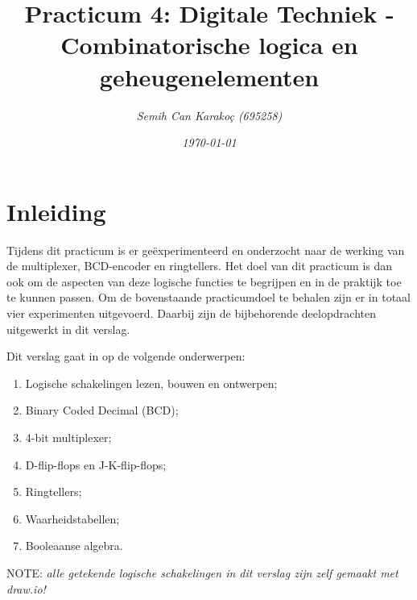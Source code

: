 \documentclass[12pt]{article}
\title{\textbf{Practicum 4: Digitale Techniek - Combinatorische logica en geheugenelementen }}
\author{\textit{Semih Can Karakoç (695258)}}
\date{\textit{\today}}
\begin{document}
\clearpage\maketitle    %
\thispagestyle{empty}  %
\begin{figure}[h]
    \centering
\end{figure}
\pagebreak

\tableofcontents    %
\pagebreak

\section{Inleiding}
Tijdens dit practicum is er geëxperimenteerd en onderzocht naar de werking van de multiplexer, BCD-encoder en ringtellers.
Het doel van dit practicum is dan ook om de aspecten van deze logische functies te begrijpen en in de praktijk toe te kunnen passen.
Om de bovenstaande practicumdoel te behalen zijn er in totaal vier experimenten uitgevoerd. 
Daarbij zijn de bijbehorende deelopdrachten uitgewerkt in dit verslag. 

Dit verslag gaat in op de volgende onderwerpen: 
\begin{enumerate}
    \item Logische schakelingen lezen, bouwen en ontwerpen;
    \item Binary Coded Decimal (BCD);
    \item 4-bit multiplexer;
    \item D-flip-flops en J-K-flip-flops;
    \item Ringtellers;
    \item Waarheidstabellen;
    \item Booleaanse algebra.
\end{enumerate}
\vspace{9cm}
NOTE: \textit{alle getekende logische schakelingen in dit verslag zijn zelf gemaakt met draw.io!}
\pagebreak
\end{document}
